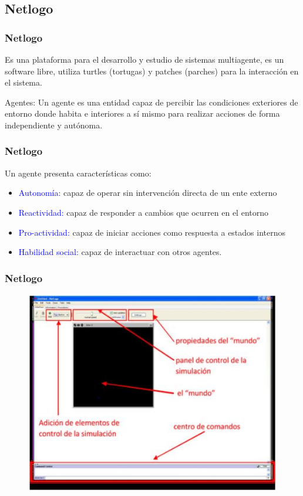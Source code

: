 \documentclass{beamer}
\begin{document}
%
\subsection{Netlogo}
%
\begin{frame}
\frametitle{Netlogo}
Es una plataforma para el desarrollo y estudio de sistemas multiagente, es un software libre, utiliza turtles (tortugas)  y patches (parches) para la interacción en el sistema.\\ 

\begin{block}{Agentes: }
	Un agente es una entidad capaz de percibir las condiciones exteriores de entorno donde habita e interiores a sí mismo para realizar acciones de forma independiente y autónoma.
\end{block}


\end{frame}
%
%
\begin{frame}
\frametitle{Netlogo}
Un agente presenta características como:
\begin{itemize}
	\item \textcolor{blue}{Autonomía:} capaz de operar sin intervención directa de un ente externo
	\item \textcolor{blue}{Reactividad:} capaz de responder a cambios que ocurren en el entorno
	\item \textcolor{blue}{Pro-actividad:} capaz de iniciar acciones como respuesta a estados internos
	\item \textcolor{blue}{Habilidad social:} capaz de interactuar con otros agentes.
\end{itemize}

\end{frame}

\begin{frame}
	\frametitle{Netlogo}
	\begin{figure}
		\label{[fig02]}
		\includegraphics[scale=0.7]{partes_Netlogo.JPG}
	\end{figure}
\end{frame}
\end{document}
